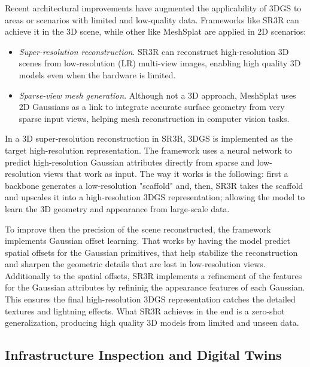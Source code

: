 \documentclass[
	a4paper, %
	10pt, %
	unnumberedsections, %
	twoside, %
]{LTJournalArticle}
\begin{document}
Recent architectural improvements have augmented the applicability of 3DGS to areas or scenarios with limited and low-quality data. Frameworks like SR3R \cite{sr3r} can achieve it in the 3D scene, while other like MeshSplat \cite{meshsplat} are applied in 2D scenarios:
\begin{itemize}
	\item \textit{Super-resolution reconstruction}. SR3R can reconstruct high-resolution 3D scenes from low-resolution (LR) multi-view images, enabling high quality 3D models even when the hardware is limited.
	\item \textit{Sparse-view mesh generation}. Although not a 3D approach, MeshSplat uses 2D Gaussians as a link to integrate accurate surface geometry from very sparse input views, helping mesh reconstruction in computer vision tasks.
\end{itemize}

In a 3D super-resolution reconstruction in SR3R, 3DGS is implemented as the target high-resolution representation. The framework uses a neural network to predict high-resolution Gaussian attributes directly from sparse and low-resolution views that work as input. The way it works is the following: first a backbone generates a low-resolution "scaffold" and, then, SR3R takes the scaffold and upscales it into a high-resolution 3DGS representation; allowing the model to learn the 3D geometry and appearance from large-scale data.

To improve then the precision of the scene reconstructed, the framework implements Gaussian offset learning. That works by having the model predict spatial offsets for the Gaussian primitives, that help stabilize the reconstruction and sharpen the geometric details that are lost in low-resolution views. Additionally to the spatial offsets, SR3R implements a refinement of the features for the Gaussian attributes by refininig the appearance features of each Gaussian. This ensures the final high-resolution 3DGS representation catches the detailed textures and lightning effects. What SR3R achieves in the end is a zero-shot generalization, producing high quality 3D models from limited and unseen data.

\subsection{Infrastructure Inspection and Digital Twins}
\end{document}
